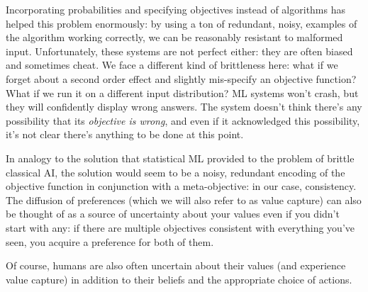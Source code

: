 \documentclass{article}
\begin{document}
	Incorporating probabilities and specifying objectives instead of algorithms has helped this problem enormously: by using a ton of redundant, noisy, examples of the algorithm working correctly, we can be reasonably resistant to malformed input. Unfortunately, these systems are not perfect either: they are often biased and sometimes cheat. We face a different kind of brittleness here: what if we forget about a second order effect and slightly mis-specify an objective function? What if we run it on a different input distribution? ML systems won't crash, but they will confidently display  wrong answers. The system doesn't think there's any possibility that its \textit{objective is wrong}, and even if it acknowledged this possibility, it's not clear there's anything to be done at this point.
	
	{\color{green!30!black}In analogy to the solution that statistical ML provided to the problem of brittle classical AI, the solution would seem to be a noisy, redundant encoding of the objective function in conjunction with a meta-objective: in our case, consistency. The diffusion of preferences (which we will also refer to as value capture) can also be thought of as a source of uncertainty about your values even if you didn't start with any: if there are multiple objectives consistent with everything you've seen, you acquire a preference for both of them.}
	
	Of course, humans are also often uncertain about their values (and experience value capture) in addition to their beliefs and the appropriate choice of actions.
	
	
	
	
\end{document}
